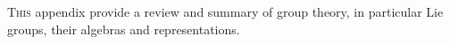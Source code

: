 

\lettrine{T}{his} appendix provide a review and summary of group theory, in
particular Lie groups,  their
algebras and representations.


